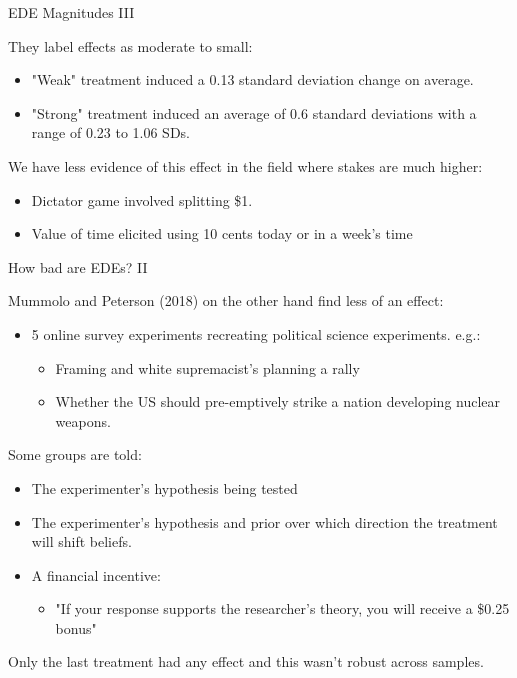 \documentclass[aspectratio=169,xcolor=dvipsnames]{beamer}
\begin{document}
\begin{frame}{EDE Magnitudes III}

    They label effects as moderate to small:
    
    \begin{itemize}
        \item  "Weak" treatment induced a 0.13 standard deviation change on average.
        \item "Strong" treatment induced an average of 0.6 standard deviations with a 
        range of 0.23 to 1.06 SDs.
    \end{itemize}



    We have less evidence of this effect in the field where stakes are much 
    higher:

    \begin{itemize}
        \item Dictator game involved splitting \$1.
        \item Value of time elicited using 10 cents today or in a week's time
    \end{itemize}
\end{frame}

\begin{frame}{How bad are EDEs? II}

    Mummolo and Peterson (2018) on the other hand find less of an effect:
    \begin{itemize}
        \item 5 online survey experiments recreating political science experiments. e.g.:
        \begin{itemize}
            \item Framing and white supremacist's planning a rally
            \item Whether the US should pre-emptively strike a nation developing nuclear weapons.
        \end{itemize}
    \end{itemize}      

    Some groups are told:
    \begin{itemize}
        \item The experimenter's hypothesis being tested
        \item The experimenter's hypothesis and prior over which direction the treatment will shift beliefs.
        \item A financial incentive: 
        \begin{itemize}
            \item "If your response supports the researcher's theory, you will receive a \$0.25 bonus"
        \end{itemize}    
    \end{itemize}

    Only the last treatment had any effect and this wasn't robust across samples.

\end{frame}
\end{document}

